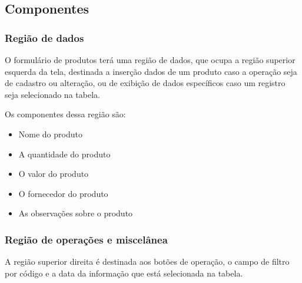 \documentclass[
	article,			%
	12pt,				%
	oneside,			%
	a4paper,			%
	english,			%
	brazil,				%
	sumario=tradicional
	]{abntex2}
\begin{document}
		\subsection{Componentes}
			\subsubsection{Região de dados}
			O formulário de produtos terá uma região de dados, que ocupa a região superior esquerda da tela, destinada a inserção dados de um produto caso a operação seja de cadastro ou alteração, ou de exibição de dados específicos caso um registro seja selecionado na tabela.
			
			Os componentes dessa região são:
			\begin{itemize}\itemsep1.5pt
				\item Nome do produto
				\item A quantidade do produto
				\item O valor do produto
				\item O fornecedor do produto
				\item As observações sobre o produto
			\end{itemize}	
			\subsubsection{Região de operações e miscelânea}
			A região superior direita é destinada aos botões de operação, o campo de filtro por código e a data da informação que está selecionada na tabela.
\end{document}
